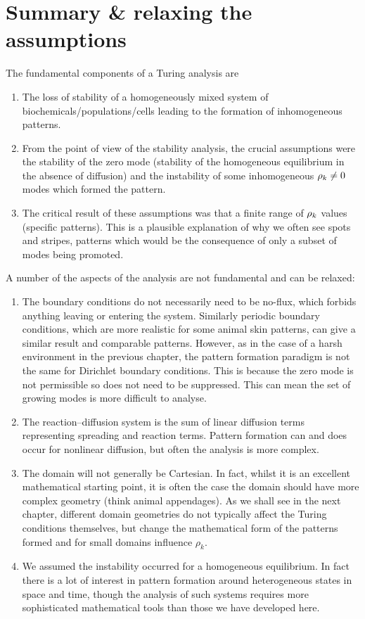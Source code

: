 \documentclass[main.tex]{subfiles}
\begin{document}
\section{Summary \& relaxing the assumptions}
The fundamental components of a Turing analysis are 
\begin{enumerate}
\item{The loss of stability of a homogeneously mixed system of biochemicals/populations/cells leading to the formation of inhomogeneous patterns.}
\item{From the point of view of the stability analysis, the crucial assumptions were the stability of  the zero mode (stability of the homogeneous equilibrium in the absence of diffusion) and the instability of some  inhomogeneous $\rho_k\neq 0$ modes which formed the pattern.}
\item{The critical result of these assumptions was that a finite range of $\rho_k$ values (specific patterns). 
This is a plausible explanation of why we often see spots and stripes, patterns which would be the consequence of only a subset of modes being promoted.  }
\end{enumerate}
A number of the aspects of the analysis are not fundamental and can be relaxed:
\begin{enumerate}
\item{The boundary conditions do not necessarily need to be no-flux, which forbids anything leaving or entering the system. Similarly periodic boundary conditions, which are more realistic for some animal skin patterns, can give a similar result and comparable patterns. However, as in the case of a harsh environment in the previous chapter, the pattern formation paradigm is not the same for Dirichlet boundary conditions. This is because the zero mode is not permissible so does not need to be suppressed. This can mean the set of growing modes is more difficult to analyse.}
\item{The reaction--diffusion system is the sum of linear diffusion terms representing spreading and reaction terms. Pattern formation can and does occur for nonlinear diffusion, but often the analysis is more complex. }
\item{The domain will not generally be Cartesian. In fact, whilst it is an excellent mathematical starting point, it is often the case the domain should  have more complex geometry (think animal appendages). As we shall see in the next chapter, different domain geometries do not typically affect the Turing conditions themselves, but change the mathematical form of the patterns formed and for small domains influence $\rho_k$.}
\item{We assumed the instability occurred for  a homogeneous equilibrium. In fact there is a lot of interest in pattern formation around heterogeneous states in space and time, though the analysis of such systems requires more sophisticated mathematical tools than those we have developed here.}
\end{enumerate}
\end{document}
